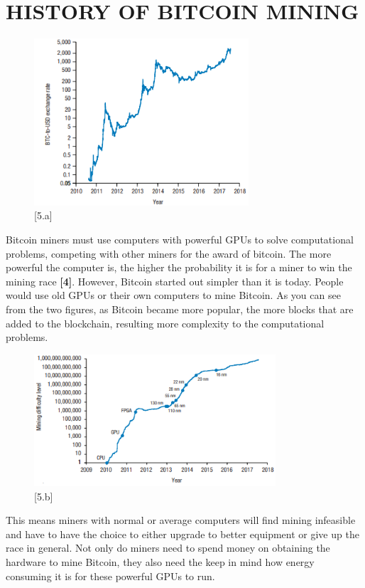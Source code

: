 \documentclass[letterpaper, 10 pt, conference]{ieeeconf}  %
\begin{document}
\section{HISTORY OF BITCOIN MINING}
\begin{figure}[h!]
  \includegraphics[width=8cm]{exchange.PNG}
  \caption*{[5.a]}
\end{figure}
Bitcoin miners must use computers with powerful GPUs to solve computational problems, competing with other miners for the award of bitcoin. The more powerful the computer is, the higher the probability it is for a miner to win the mining race \textbf{[4]}. However, Bitcoin started out simpler than it is today. People would use old GPUs or their own computers to mine Bitcoin. As you can see from the two figures, as Bitcoin became more popular, the more blocks that are added to the blockchain, resulting more complexity to the computational problems. 
\begin{figure}[h!]
  \includegraphics[width=9cm]{diff.PNG}
  \caption*{[5.b]}
\end{figure}
This means miners with normal or average computers will find mining infeasible and have to have the choice to either upgrade to better equipment or give up the race in general. Not only do miners need to spend money on obtaining the hardware to mine Bitcoin, they also need the keep in mind how energy consuming it is for these powerful GPUs to run. 
\end{document}
